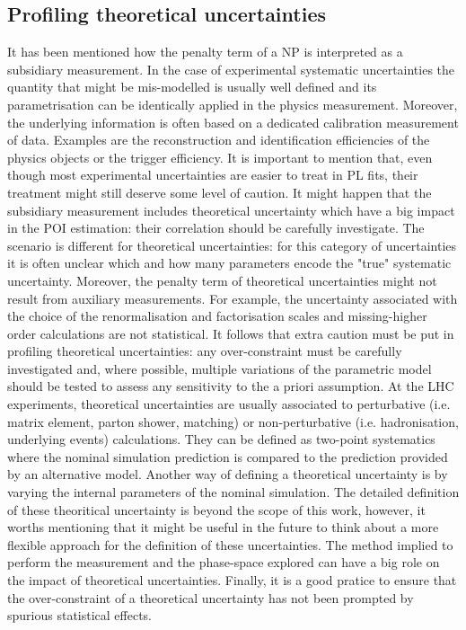 \documentclass[12pt]{article}
\begin{document}
\subsection{Profiling theoretical uncertainties}
It has been mentioned how the penalty term of a NP is interpreted as a subsidiary measurement. In the case of experimental systematic uncertainties the quantity that might be mis-modelled is usually well defined and its parametrisation can be identically applied in the physics measurement. Moreover, the underlying information is often based on a dedicated calibration measurement of data. Examples are the reconstruction and identification efficiencies of the physics objects or the trigger efficiency. It is important to mention that, even though most experimental uncertainties are easier to treat in PL fits, their treatment might still deserve some level of caution. It might happen that the subsidiary measurement includes theoretical uncertainty which have a big impact in the POI estimation: their correlation should be carefully investigate.
The scenario is different for theoretical uncertainties: for this category of uncertainties it is often unclear which and how many parameters encode the "true" systematic uncertainty. Moreover, the penalty term of theoretical uncertainties might not result from auxiliary measurements. For example, the uncertainty associated with the choice of the renormalisation and factorisation scales and missing-higher order calculations are not statistical. It follows that extra caution must be put in profiling theoretical uncertainties: any over-constraint must be carefully investigated and, where possible, multiple variations of the parametric model should be tested to assess any sensitivity to the a priori assumption.
At the LHC experiments, theoretical uncertainties are usually associated to perturbative (i.e. matrix element, parton shower, matching) or non-perturbative (i.e. hadronisation, underlying events) calculations. They can be defined as two-point systematics where the nominal simulation prediction is compared to the prediction provided by an alternative model. Another way of defining a theoretical uncertainty is by varying the internal parameters of the nominal simulation. The detailed definition of these theoritical uncertainty is beyond the scope of this work, however, it worths mentioning that it might be useful in the future to think about a more flexible approach for the definition of these uncertainties. The method implied to perform the measurement and the phase-space explored can have a big role on the impact of theoretical uncertainties. 
Finally, it is a good pratice to ensure that the over-constraint of a theoretical uncertainty has not been prompted by spurious statistical effects. 
\end{document}
